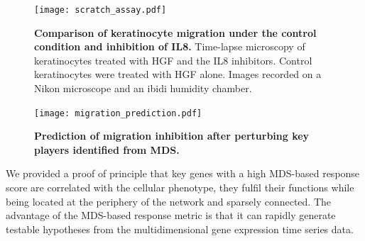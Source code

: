 \begin{figure}[!ht]
\begin{center}
\texttt{[image: scratch\_assay.pdf]}
\end{center}
\caption[Migration of keratinocytes]{
{\bf Comparison of keratinocyte migration under the control condition and 
inhibition of IL8.}
Time-lapse microscopy of keratinocytes treated with HGF and the IL8 inhibitors. 
Control keratinocytes were treated with HGF alone. Images recorded on a Nikon 
microscope and an ibidi humidity chamber.
}
\label{fig:scratch_assay}
\end{figure}

\begin{figure}[!ht]
\begin{center}
\texttt{[image: migration\_prediction.pdf]}
\end{center}
\caption[Prediction of migration inhibition after perturbing key players]{
{\bf Prediction of migration inhibition after perturbing key players identified
from MDS.} 
}
\label{fig:migration_prediction}
\end{figure}

We provided a proof of principle that key genes with a high MDS-based response
score are correlated with the cellular phenotype, they fulfil their functions
while being located at the periphery of the network and sparsely connected.
The advantage of the MDS-based response metric is that it can rapidly generate
testable hypotheses from the multidimensional gene expression time series data.

